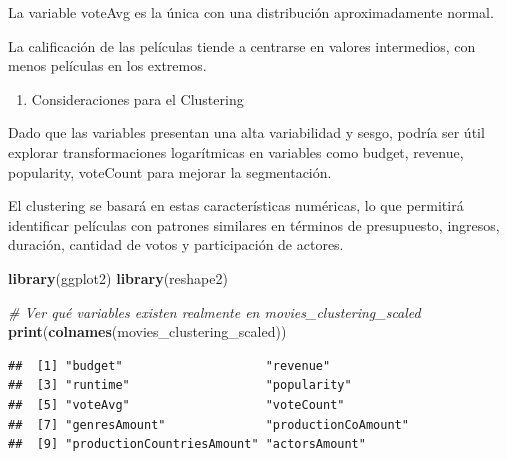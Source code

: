\documentclass[
]{article}
\newenvironment{Shaded}{\begin{snugshade}}{\end{snugshade}}
\newcommand{\CommentTok}[1]{\textcolor[rgb]{0.56,0.35,0.01}{\textit{#1}}}
\newcommand{\FunctionTok}[1]{\textcolor[rgb]{0.13,0.29,0.53}{\textbf{#1}}}
\newcommand{\NormalTok}[1]{#1}
\providecommand{\tightlist}{%
  \setlength{\itemsep}{0pt}\setlength{\parskip}{0pt}}
\begin{document}
La variable voteAvg es la única con una distribución aproximadamente
normal.

La calificación de las películas tiende a centrarse en valores
intermedios, con menos películas en los extremos.

\begin{enumerate}
\def\labelenumi{\arabic{enumi}.}
\setcounter{enumi}{5}
\tightlist
\item
  Consideraciones para el Clustering
\end{enumerate}

Dado que las variables presentan una alta variabilidad y sesgo, podría
ser útil explorar transformaciones logarítmicas en variables como
budget, revenue, popularity, voteCount para mejorar la segmentación.

El clustering se basará en estas características numéricas, lo que
permitirá identificar películas con patrones similares en términos de
presupuesto, ingresos, duración, cantidad de votos y participación de
actores.

\begin{Shaded}
\begin{Highlighting}[]
\FunctionTok{library}\NormalTok{(ggplot2)}
\FunctionTok{library}\NormalTok{(reshape2)}

\CommentTok{\# Ver qué variables existen realmente en movies\_clustering\_scaled}
\FunctionTok{print}\NormalTok{(}\FunctionTok{colnames}\NormalTok{(movies\_clustering\_scaled))}
\end{Highlighting}
\end{Shaded}

\begin{verbatim}
##  [1] "budget"                    "revenue"                  
##  [3] "runtime"                   "popularity"               
##  [5] "voteAvg"                   "voteCount"                
##  [7] "genresAmount"              "productionCoAmount"       
##  [9] "productionCountriesAmount" "actorsAmount"
\end{verbatim}
\end{document}

